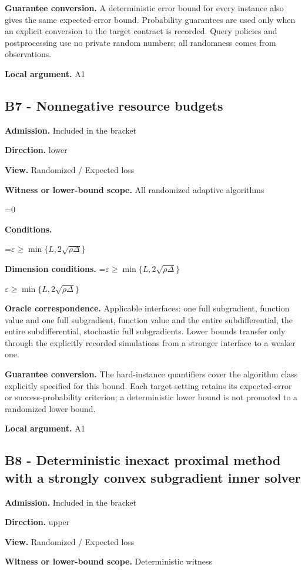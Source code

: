 \documentclass[10pt,a4paper]{article}
\newcommand{\AtlasMath}[1]{\par\begingroup\centering\setbox0=\hbox{$\displaystyle #1$}\ifdim\wd0>1.4\linewidth\typeout{ATLAS WIDE FORMULA: \the\wd0}\fi\ifdim\wd0>\linewidth\resizebox{\linewidth}{!}{\box0}\else\box0\fi\par\endgroup}
\newcommand{\AtlasInlineMath}[1]{\begingroup\setbox0=\hbox{$#1$}\ifdim\wd0>.4\linewidth\endgroup\AtlasMath{#1}\else\endgroup$#1$\fi}
\begin{document}
\textbf{Guarantee conversion.} A deterministic error bound for every instance also gives the same expected-error bound. Probability guarantees are used only when an explicit conversion to the target contract is recorded. Query policies and postprocessing use no private random numbers; all randomness comes from observations.

\textbf{Local argument.} A1

\subsection{B7 - Nonnegative resource budgets}
\textbf{Admission.} Included in the bracket

\textbf{Direction.} lower

\textbf{View.} Randomized / Expected loss

\textbf{Witness or lower-bound scope.} All randomized adaptive algorithms

\AtlasMath{0}
\textbf{Conditions.} 
\AtlasMath{\varepsilon\ge\min\{L,2\sqrt{\rho\Delta}\}}


\textbf{Dimension conditions.} \AtlasInlineMath{\varepsilon\ge\min\{L,2\sqrt{\rho\Delta}\}}

\textbf{Oracle correspondence.} Applicable interfaces: one full subgradient, function value and one full subgradient, function value and the entire subdifferential, the entire subdifferential, stochastic full subgradients. Lower bounds transfer only through the explicitly recorded simulations from a stronger interface to a weaker one.

\textbf{Guarantee conversion.} The hard-instance quantifiers cover the algorithm class explicitly specified for this bound. Each target setting retains its expected-error or success-probability criterion; a deterministic lower bound is not promoted to a randomized lower bound.

\textbf{Local argument.} A1

\subsection{B8 - Deterministic inexact proximal method with a strongly convex subgradient inner solver}
\textbf{Admission.} Included in the bracket

\textbf{Direction.} upper

\textbf{View.} Randomized / Expected loss

\textbf{Witness or lower-bound scope.} Deterministic witness
\end{document}

